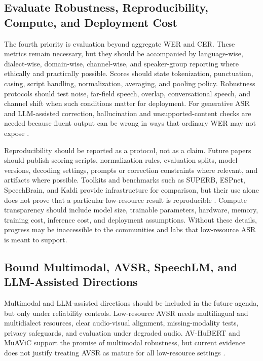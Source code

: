 \documentclass[pdflatex,sn-basic,iicol]{sn-jnl}
\theoremstyle{thmstyleone}
\theoremstyle{thmstyletwo}
\theoremstyle{thmstylethree}
\begin{document}
\subsection{Evaluate Robustness, Reproducibility, Compute, and Deployment Cost}

The fourth priority is evaluation beyond aggregate WER and CER. These metrics remain necessary, but they should be accompanied by language-wise, dialect-wise, domain-wise, channel-wise, and speaker-group reporting where ethically and practically possible. Scores should state tokenization, punctuation, casing, script handling, normalization, averaging, and pooling policy. Robustness protocols should test noise, far-field speech, overlap, conversational speech, and channel shift when such conditions matter for deployment. For generative ASR and LLM-assisted correction, hallucination and unsupported-content checks are needed because fluent output can be wrong in ways that ordinary WER may not expose \citep{koenecke2024carelesswhisper}.

Reproducibility should be reported as a protocol, not as a claim. Future papers should publish scoring scripts, normalization rules, evaluation splits, model versions, decoding settings, prompts or correction constraints where relevant, and artifacts where possible. Toolkits and benchmarks such as SUPERB, ESPnet, SpeechBrain, and Kaldi provide infrastructure for comparison, but their use alone does not prove that a particular low-resource result is reproducible \citep{yang2021superb,watanabe2018espnet,ravanelli2021speechbrain,povey2011kaldi}. Compute transparency should include model size, trainable parameters, hardware, memory, training cost, inference cost, and deployment assumptions. Without these details, progress may be inaccessible to the communities and labs that low-resource ASR is meant to support.

\subsection{Bound Multimodal, AVSR, SpeechLM, and LLM-Assisted Directions}

Multimodal and LLM-assisted directions should be included in the future agenda, but only under reliability controls. Low-resource AVSR needs multilingual and multidialect resources, clear audio-visual alignment, missing-modality tests, privacy safeguards, and evaluation under degraded audio. AV-HuBERT and MuAViC support the promise of multimodal robustness, but current evidence does not justify treating AVSR as mature for all low-resource settings \citep{shi2022avhubert,anwar23_interspeech}.
\end{document}
